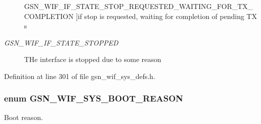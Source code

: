 \begin{Desc}
\begin{description}
{\hypertarget{a00639_gga5b5ea6b444509449484db8bf22612b98a772f04af861bc5f56c255305c5354365}{
GSN\_\-WIF\_\-IF\_\-STATE\_\-STOP\_\-REQUESTED\_\-WAITING\_\-FOR\_\-TX\_\-COMPLETION}
\label{a00639_gga5b5ea6b444509449484db8bf22612b98a772f04af861bc5f56c255305c5354365}
}]if stop is requested, waiting for completion of pending TX s \item[{\em 
\hypertarget{a00639_gga5b5ea6b444509449484db8bf22612b98a993c121d2959bd02efde4f10104b0ad3}{
GSN\_\-WIF\_\-IF\_\-STATE\_\-STOPPED}
\label{a00639_gga5b5ea6b444509449484db8bf22612b98a993c121d2959bd02efde4f10104b0ad3}
}]THe interface is stopped due to some reason \end{description}
\end{Desc}



Definition at line 301 of file gsn\_\-wif\_\-sys\_\-defs.h.

\hypertarget{a00639_ga36af0a76d3b3d7cad5c5dd1f60c39091}{
\subsubsection[{GSN\_\-WIF\_\-SYS\_\-BOOT\_\-REASON}]{\setlength{\rightskip}{0pt plus 5cm}enum {\bf GSN\_\-WIF\_\-SYS\_\-BOOT\_\-REASON}}}
\label{a00639_ga36af0a76d3b3d7cad5c5dd1f60c39091}


Boot reason. 

